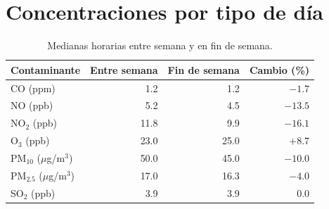 \documentclass[11pt]{article}
\begin{document}
\section{Concentraciones por tipo de día}
\label{anexo:dias}
\begin{table}[H]
\centering
\small
\caption{Medianas horarias entre semana y en fin de semana.}
\begin{tabular}{lrrr}
\toprule
\textbf{Contaminante} & \textbf{Entre semana} & \textbf{Fin de semana} & \textbf{Cambio (\%)} \\
\midrule
CO (ppm) & 1.2 & 1.2 & $-1.7$ \\
NO (ppb) & 5.2 & 4.5 & $-13.5$ \\
NO$_2$ (ppb) & 11.8 & 9.9 & $-16.1$ \\
O$_3$ (ppb) & 23.0 & 25.0 & $+8.7$ \\
PM$_{10}$ ($\mu$g/m$^3$) & 50.0 & 45.0 & $-10.0$ \\
PM$_{2.5}$ ($\mu$g/m$^3$) & 17.0 & 16.3 & $-4.0$ \\
SO$_2$ (ppb) & 3.9 & 3.9 & 0.0 \\
\bottomrule
\end{tabular}
\end{table}
 
\end{document}
